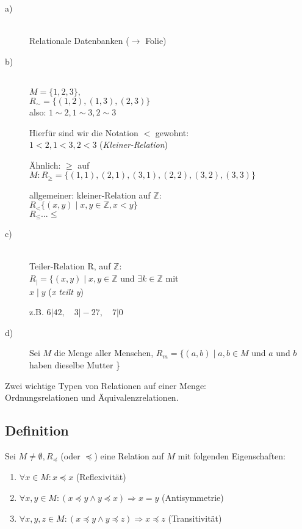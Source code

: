 \documentclass[a4paper, 12pt, twoside] {article}
\begin{document}
\begin{description}
\item[a)] \hfill \\
Relationale Datenbanken ($\rightarrow$ Folie)

\item[b)] \hfill \\
$M = \{1, 2, 3 \} ,$ \\
$R_{\sim} = \{(1, 2), (1, 3), (2, 3) \}$ \\
also: $1 \sim 2, 1  \sim 3, 2  \sim 3$

Hierfür sind wir die Notation \textit{$<$} gewohnt: \\
$1 < 2, 1 < 3, 2 < 3$ (\textit{Kleiner-Relation})

Ähnlich: $\geq$ auf $M: R_{\geq} = \{(1, 1), (2, 1), (3, 1), (2, 2), (3, 2), (3, 3) \}$

allgemeiner: kleiner-Relation auf $\mathbb{Z}$: \\
$R_{<} \{(x, y) \mid x, y \in \mathbb{Z}, x < y \}$ \\
$R_{\leq} ... \leq$

\item[c)] \hfill \\
Teiler-Relation R, auf $\mathbb{Z}$: \\
$R_{|} = \{(x, y) \mid x, y \in \mathbb{Z}$ und $ \exists k \in \mathbb{Z}$ mit \\
$x \mid y$ (\textit{x teilt y})

z.B. $6|42, \quad 3|-27, \quad 7|0$

\item[d)] Sei $M$ die Menge aller Menschen, $R_m = \{(a, b) \mid a, b \in M$ und $a$ und $b$ haben dieselbe Mutter \}

\end{description}

Zwei wichtige Typen von Relationen auf einer Menge: \\
Ordnungsrelationen und Äquivalenzrelationen.

\subsection{Definition}
Sei $M \neq \emptyset, R_{\preceq}$ (oder $\preceq$) eine Relation auf $M$ mit folgenden Eigenschaften:

\begin{enumerate}

\item $\forall x \in M: x \preceq x$ (Reflexivität)

\item $\forall x, y \in M: (x \preceq y \wedge y \preceq x) \Rightarrow x = y$ (Antisymmetrie)

\item $\forall x, y, z \in M: (x \preceq y \wedge y \preceq z) \Rightarrow x \preceq z$ (Transitivität)

\end{enumerate}
\end{document}
